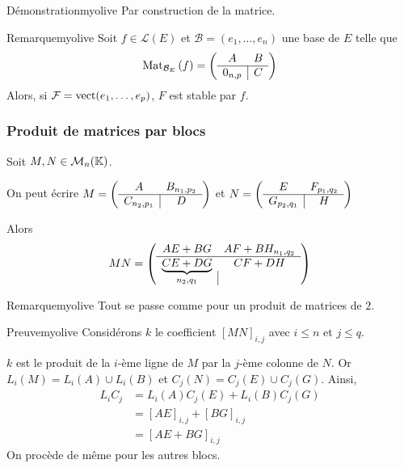     \begin{demo}{Démonstration}{myolive}
        Par construction de la matrice.
    \end{demo}

    \begin{omed}{Remarque}{myolive}
        Soit $f \in \mathcal{L}(E)$ et $\mathcal{B} = (e_1,\ldots,e_n)$ une base de $E$ telle que 
        \[ \text{Mat}_{\mathcal{B}_E}\left(f\right) = \left( \begin{array}{c | c}
            A & B \\
            \hline 
            0_{n,p} & C 
        \end{array} \right) \]
        Alors, si $\mathcal{F} = \operatorname{vect}(e_1,\ldots,e_p)$, $F$ est stable par $f$.
    \end{omed}

    \subsubsection{Produit de matrices par blocs}

    \begin{prop}{}{}
        Soit $M,N \in \mathcal{M}_{n}(\mathbb{K})$.

        On peut écrire $M = \left( \begin{array}{c | c}
            A & B_{n_1,p_2} \\
            \hline 
            C_{n_2, p_1} & D 
        \end{array} \right)$ 
        et 
        $N = \left( \begin{array}{c | c}
            E & F_{p_1, q_2} \\
            \hline 
            G_{p_2, q_1} & H 
        \end{array} \right)$

        Alors 
        \[ MN = \left( \begin{array}{c | c}
            AE + BG & AF + BH_{n_1,q_2} \\ 
            \hline 
            \underbrace{CE + DG}_{n_2,q_1} & CF+DH
        \end{array} \right) \]
    \end{prop}

    \begin{omed}{Remarque}{myolive}
        Tout se passe comme pour un produit de matrices de $2$.
    \end{omed}
    
    \begin{demo}{Preuve}{myolive}
        Considérons $k$ le coefficient $[MN]_{i,j}$ avec $i \leq n$ et $j \leq q$.
    
        $k$ est le produit de la $i$-ème ligne de $M$ par la $j$-ème colonne de $N$. Or $L_i(M) = L_i(A) \cup L_i(B)$ et $C_j(N) = C_j(E) \cup C_j(G)$. Ainsi,
        \begin{align*}
            L_i C_j 
            &= L_i(A) C_j(E) + L_i(B) C_j(G) \\
            &= [AE]_{i,j} + [BG]_{i,j} \\
            &= [AE + BG]_{i,j}
        \end{align*}
        On procède de même pour les autres blocs.
    \end{demo}

